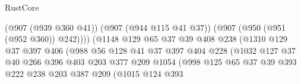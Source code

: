 \begin{lexlean}{RustCore}
\begin{coremodule}
                                              (@907 (@939 @360 @41))
                                              (@907 (@944 @115 @41 @37))
                                              (@907 (@950 (@951 (@952 @360)) @242))))
                                          (@1148
                                            @129
                                            @65
                                            @37
                                            @39
                                            @408
                                            @238
                                            (@1310
                                              @129
                                              @37
                                              @397
                                              @406
                                              (@988
                                                @56
                                                @128
                                                @41
                                                @37
                                                @397
                                                @404
                                                @228
                                                (@1032
                                                  @127
                                                  @37
                                                  @40
                                                  @266
                                                  @396
                                                  @403
                                                  @203
                                                  @377
                                                  @209
                                                  @1054
                                                  (@998
                                                    @125
                                                    @65
                                                    @37
                                                    @39
                                                    @393
                                                    @222
                                                    @238
                                                    @203
                                                    @387
                                                    @209
                                                    (@1015
                                                      @124
                                                      @393

\end{coremodule}
\end{lexlean}
